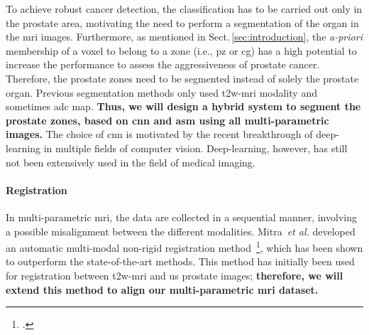 To achieve robust cancer detection, the classification has to be carried out only in the prostate area, motivating the need to perform a segmentation of the organ in the \ac{mri} images.
Furthermore, as mentioned in Sect.\,\ref{sec:introduction}, the \emph{a-priori} membership of a voxel to belong to a zone (i.e., \ac{pz} or \ac{cg}) has a high potential to increase the performance to assess the aggressiveness of prostate cancer.
Therefore, the prostate zones need to be segmented instead of solely the prostate organ.
Previous segmentation methods only used \ac{t2w}-\ac{mri} modality and sometimes \ac{adc} map.
\textbf{Thus, we will design a hybrid system to segment the prostate zones, based on \ac{cnn} and \ac{asm} using all multi-parametric images.}
The choice of \ac{cnn} is motivated by the recent breakthrough of deep-learning in multiple fields of computer vision.
Deep-learning, however, has still not been extensively used in the field of medical imaging.

\paragraph{Registration}

In multi-parametric \ac{mri}, the data are collected in a sequential manner, involving a possible misalignment between the different modalities.
Mitra~\emph{et al.} developed an automatic multi-modal non-rigid registration method~\footcite{Mitra2012a}, which has been shown to outperform the state-of-the-art methods.
This method has initially been used for registration between \ac{t2w}-\ac{mri} and \ac{us} prostate images; \textbf{therefore, we will extend this method to align our multi-parametric \ac{mri} dataset.}

